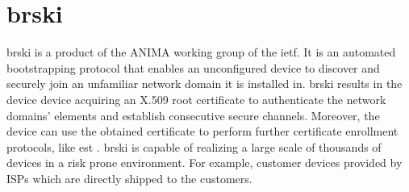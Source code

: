 \section{\acrfull*{brski}}
\gls{brski} is a product of the ANIMA working group of the \gls{ietf}. It is an automated bootstrapping protocol that enables an unconfigured device to discover and securely join an unfamiliar network domain it is installed in. \gls{brski} results in the device device acquiring an X.509 root certificate to authenticate the network domains' elements and establish consecutive secure channels. Moreover, the device can use the obtained certificate to perform further certificate enrollment protocols, like \gls{est} \cite{rfc7030}. \gls{brski} is capable of realizing a large scale of thousands of devices in a risk prone environment. For example, customer devices provided by ISPs which are directly shipped to the customers.




